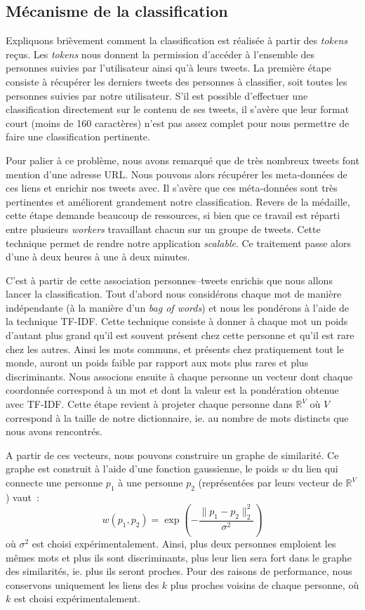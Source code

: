\documentclass[a4paper]{article}
\begin{document}
\subsection{Mécanisme de la classification}
Expliquons brièvement comment la classification est réalisée à partir des \emph{tokens} reçus. Les \emph{tokens} nous donnent la permission d'accéder à l'ensemble des personnes suivies par l'utilisateur ainsi qu'à leurs tweets. La première étape consiste à récupérer les derniers tweets des personnes à classifier, soit toutes les personnes suivies par notre utilisateur. S'il est possible d'effectuer une classification directement sur le contenu de ses tweets, il s'avère que leur format court (moins de 160 caractères) n'est pas assez complet pour nous permettre de faire une classification pertinente. 

Pour palier à ce problème, nous avons remarqué que de très nombreux tweets font mention d'une adresse URL. Nous pouvons alors récupérer les meta-données de ces liens et enrichir nos tweets avec. Il s'avère que ces méta-données sont très pertinentes et améliorent grandement notre classification. Revers de la médaille, cette étape demande beaucoup de ressources, si bien que ce travail est réparti entre plusieurs \emph{workers} travaillant chacun sur un groupe de tweets. Cette technique permet de rendre notre application \emph{scalable}. Ce traitement passe alors d'une à deux heures à une à deux minutes.

C'est à partir de cette association personnes--tweets enrichis que nous allons lancer la classification. Tout d'abord nous considérons chaque mot de manière indépendante (à la manière d'un \emph{bag of words}) et nous les pondérons à l'aide de la technique TF-IDF. Cette technique consiste à donner à chaque mot un poids d'autant plus grand qu'il est souvent présent chez cette personne et qu'il est rare chez les autres. Ainsi les mots communs, et présents chez pratiquement tout le monde, auront un poids faible par rapport aux mots plus rares et plus discriminants. Nous associons ensuite à chaque personne un vecteur dont chaque coordonnée correspond à un mot et dont la valeur est la pondération obtenue avec TF-IDF. Cette étape revient à projeter chaque personne dans $\mathbb{R}^V$ où $V$ correspond à la taille de notre dictionnaire, ie. au nombre de mots distincts que nous avons rencontrés.

A partir de ces vecteurs, nous pouvons construire un graphe de similarité. Ce graphe est construit à l'aide d'une fonction gaussienne, le poids $w$ du lien qui connecte une personne $p_1$ à une personne $p_2$ (représentées par leurs vecteur de $\mathbb{R}^V$) vaut~:
\[
w(p_1, p_2) = \exp \left( - \frac{ \| p_1 - p_2 \|_2^2 }{\sigma^2} \right)
\]
où $\sigma^2$ est choisi expérimentalement. Ainsi, plus deux personnes emploient les mêmes mots et plus ils sont discriminants, plus leur lien sera fort dans le graphe des similarités, ie. plus ils seront proches. Pour des raisons de performance, nous conservons uniquement les liens des $k$ plus proches voisins de chaque personne, où $k$ est choisi expérimentalement.
\end{document}
